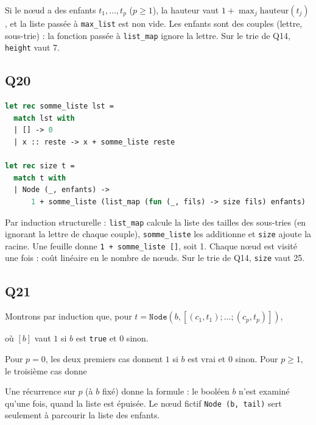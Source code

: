 \documentclass[11pt,a4paper]{article}
\newcommand{\equationajustee}[1]{%
  \sbox{\boiteequation}{$\displaystyle #1$}%
  \ifdim\wd\boiteequation>\linewidth
    \[\resizebox{\linewidth}{!}{\usebox{\boiteequation}}\]%
  \else
    \[#1\]%
  \fi}
\begin{document}
Si le nœud a des enfants \(t_1, \dots, t_p\) (\(p \ge 1\)), la hauteur vaut \(1 + \max_j \mathrm{hauteur}(t_j)\), et la liste passée à \texttt{max\_list} est non vide. Les enfants sont des couples (lettre, sous-trie) : la fonction passée à \texttt{list\_map} ignore la lettre. Sur le trie de Q14, \texttt{height} vaut 7.

\hypertarget{q20}{%
\subsection{Q20}\label{q20}}

\begin{lstlisting}[language=Caml]
let rec somme_liste lst =
  match lst with
  | [] -> 0
  | x :: reste -> x + somme_liste reste

let rec size t =
  match t with
  | Node (_, enfants) ->
      1 + somme_liste (list_map (fun (_, fils) -> size fils) enfants)
\end{lstlisting}

Par induction structurelle : \texttt{list\_map} calcule la liste des tailles des sous-tries (en ignorant la lettre de chaque couple), \texttt{somme\_liste} les additionne et \texttt{size} ajoute la racine. Une feuille donne \texttt{1\ +\ somme\_liste\ {[}{]}\allowbreak{}}, soit 1. Chaque nœud est visité une fois : coût linéaire en le nombre de nœuds. Sur le trie de Q14, \texttt{size} vaut 25.

\hypertarget{q21}{%
\subsection{Q21}\label{q21}}

Montrons par induction que, pour \(t = \texttt{Node}(b, [(c_1, t_1); \dots; (c_p, t_p)])\),

\equationajustee{f(t) = [b] + \sum_{j=1}^{p} f(t_j),}

où \([b]\) vaut \(1\) si \(b\) est \texttt{true} et \(0\) sinon.

Pour \(p = 0\), les deux premiers cas donnent \(1\) si \(b\) est vrai et \(0\) sinon. Pour \(p \ge 1\), le troisième cas donne

\equationajustee{f(t) = f(t_1) + f(\texttt{Node}(b, [(c_2, t_2); \dots; (c_p, t_p)])).}

Une récurrence sur \(p\) (à \(b\) fixé) donne la formule : le booléen \(b\) n'est examiné qu'une fois, quand la liste est épuisée. Le nœud fictif \texttt{Node\ (b,\ tail)} sert seulement à parcourir la liste des enfants.
\end{document}
